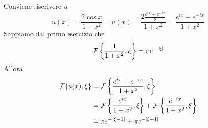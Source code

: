 Conviene riscrivere $u$
\begin{equation*}
u(x) = \frac{2\cos x}{1 + x^{2}} = u(x) = \frac{2\frac{e^{ix} + e^{- ix}}{2}}{1 + x^{2}} = \frac{e^{ix} + e^{- ix}}{1 + x^{2}}
\end{equation*}
Sappiamo dal primo esercizio che
\begin{equation*}
\mathcal{F} \left\{\frac{1}{1 + x^{2}}, \xi \right\} = \pi e^{- | \xi |}
\end{equation*}
Allora
\begin{equation*}
\begin{aligned}
\mathcal{F} \{u(x), \xi \} & = \mathcal{F} \left\{\frac{e^{ix} + e^{- ix}}{1 + x^{2}}, \xi \right\}\\
 & = \mathcal{F} \left\{\frac{e^{ix}}{1 + x^{2}}, \xi \right\} + \mathcal{F} \left\{\frac{e^{- ix}}{1 + x^{2}}, \xi \right\}\\
 & = \pi e^{- | \xi - 1|} + \pi e^{- | \xi + 1|}
\end{aligned}
\end{equation*}
\Soluzione

